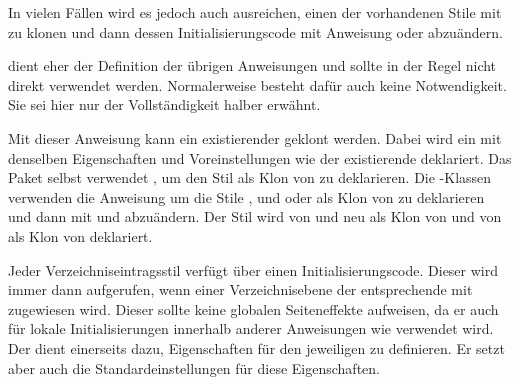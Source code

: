 In vielen Fällen wird es jedoch auch ausreichen, einen der
vorhandenen Stile mit  zu klonen
und dann dessen Initialisierungscode mit Anweisung
 oder
 abzuändern.

 dient eher der Definition der übrigen
Anweisungen und sollte in der Regel nicht direkt verwendet
werden. Normalerweise besteht dafür auch keine Notwendigkeit. Sie sei hier
nur der Vollständigkeit halber erwähnt.%
\EndIndexGroup


\begin{Declaration}
\end{Declaration}
Mit dieser Anweisung kann ein
existierender  geklont werden. Dabei wird ein 
mit denselben Eigenschaften und Voreinstellungen wie der existierende
 deklariert. Das Paket selbst verwendet
, um den Stil  als Klon von
 zu deklarieren. Die \KOMAScript-Klassen verwenden die
Anweisung um die Stile ,  und 
oder  als Klon von  zu deklarieren und dann
mit  und
 abzuändern. Der Stil
 wird von  und  neu als Klon
von  und von  als Klon von 
deklariert.%
\EndIndexGroup


\begin{Declaration}
\end{Declaration}
Jeder Verzeichniseintragsstil
verfügt über einen Initialisierungscode. Dieser wird immer dann aufgerufen,
wenn einer Verzeichnisebene der entsprechende  mit
zugewiesen wird. Dieser  sollte
keine globalen Seiteneffekte aufweisen, da er auch für lokale
Initialisierungen innerhalb anderer Anweisungen wie
 verwendet
wird. Der  dient einerseits dazu, Eigenschaften
für den jeweiligen  zu definieren. Er setzt aber auch die
Standardeinstellungen für diese Eigenschaften.

